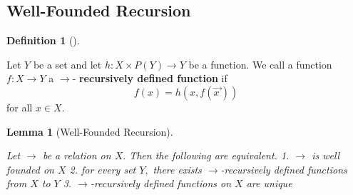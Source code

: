 \documentclass[
  letterpaper,
  10pt,
  reqno,
  twopage,
  openany]{book}
\theoremstyle{plain}
\newtheorem{lemma}{Lemma}[chapter]
\theoremstyle{definition}
\theoremstyle{definition}
\newtheorem{definition}{Definition}[chapter]
\theoremstyle{definition}
\theoremstyle{plain}
\theoremstyle{plain}
\theoremstyle{remark}
\begin{document}
\hypertarget{well-founded-recursion}{%
\subsection{Well-Founded Recursion}\label{well-founded-recursion}}

\leavevmode{}%
\begin{definition}[]\label{def-recursively-defined-function}

Let \(Y\) be a set and let \(h:X\times P(Y)\to Y\) be a function. We
call a function \(f:X\to Y\) a
\(\longrightarrow\)-
\textbf{recursively defined function} if \begin{equation}
f(x)=h(x,f(\overrightarrow{x\,}))
\end{equation} for all \(x\in X.\)

\end{definition}

\leavevmode{}%
\begin{lemma}[Well-Founded Recursion]\label{lem-well-founded-recursion}

Let \(\longrightarrow\) be a relation on \(X.\) Then the following are
equivalent. 1. \(\longrightarrow\) is well founded on \(X\) 2. for every
set \(Y,\) there exists \(\longrightarrow\)-recursively defined
functions from \(X\) to \(Y\) 3. \(\longrightarrow\)-recursively defined
functions on \(X\) are unique

\end{lemma}
\end{document}

